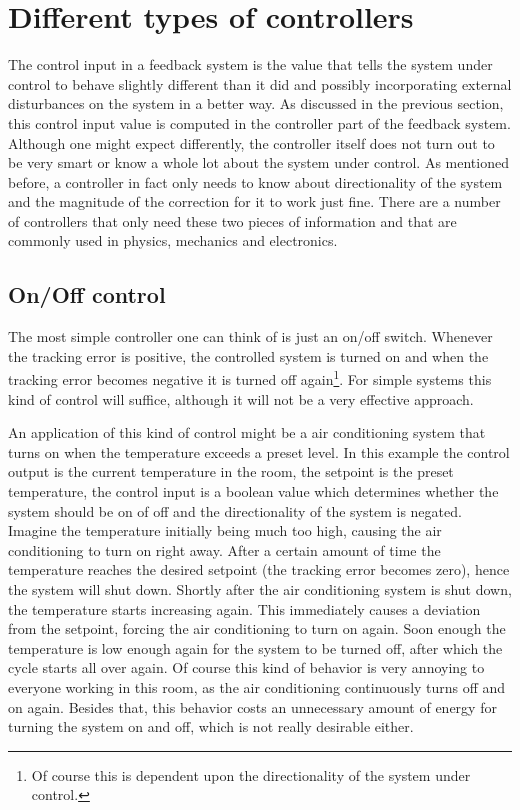 \section{Different types of controllers}
The control input in a feedback system is the value that tells the system under control to behave slightly different than it did and possibly incorporating external disturbances on the system in a better way. As discussed in the previous section, this control input value is computed in the controller part of the feedback system. Although one might expect differently, the controller itself does not turn out to be very smart or know a whole lot about the system under control. As mentioned before, a controller in fact only needs to know about directionality of the system and the magnitude of the correction for it to work just fine. There are a number of controllers that only need these two pieces of information and that are commonly used in physics, mechanics and electronics.

\subsection{On/Off control}
The most simple controller one can think of is just an on/off switch. Whenever the tracking error is positive, the controlled system is turned on and when the tracking error becomes negative it is turned off again\footnote{Of course this is dependent upon the directionality of the system under control.}. For simple systems this kind of control will suffice, although it will not be a very effective approach.

An application of this kind of control might be a air conditioning system that turns on when the temperature exceeds a preset level. In this example the control output is the current temperature in the room, the setpoint is the preset temperature, the control input is a boolean value which determines whether the system should be on of off and the directionality of the system is negated. Imagine the temperature initially being much too high, causing the air conditioning to turn on right away. After a certain amount of time the temperature reaches the desired setpoint (the tracking error becomes zero), hence the system will shut down. Shortly after the air conditioning system is shut down, the temperature starts increasing again. This immediately causes a deviation from the setpoint, forcing the air conditioning to turn on again. Soon enough the temperature is low enough again for the system to be turned off, after which the cycle starts all over again. Of course this kind of behavior is very annoying to everyone working in this room, as the air conditioning continuously turns off and on again. Besides that, this behavior costs an unnecessary amount of energy for turning the system on and off, which is not really desirable either.

